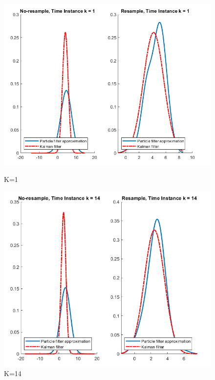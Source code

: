\begin{figure}[H]
    \centering
    \begin{minipage}[b]{0.4\textwidth}
      \centering
      \includegraphics[width=\textwidth]{images/k=1.png}
      \caption{K=1}
      \label{fig:K=1}
    \end{minipage}
    \hfill
    \begin{minipage}[b]{0.4\textwidth}
      \centering
      \includegraphics[width=\textwidth]{images/K=14.png}
      \caption{K=14}
      \label{fig:K=14}
    \end{minipage}

\end{figure}

